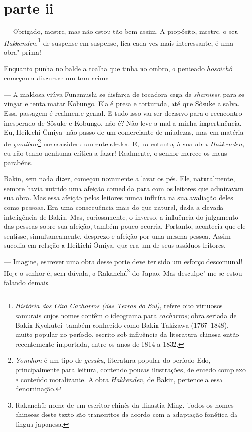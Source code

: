 \section*{parte ii}

--- Obrigado, mestre, mas não estou tão bem assim. A propósito, mestre, o
seu \textit{Hakkenden},\footnote{\textit{História dos Oito Cachorros (das Terras do Sul)}, refere oito
virtuosos samurais cujos nomes contêm o ideograma para \textit{cachorros};
obra seriada de Bakin Kyokutei, também conhecido como Bakin Takizawa 
(1767--1848), muito popular no
período, escrito sob influência da literatura chinesa então
recentemente importada, entre os anos de 1814 a 1832.} de suspense em
suspense, fica cada vez mais interessante, é uma obra"-prima!

Enquanto punha no balde a toalha que tinha no ombro, o penteado
\textit{hosoichô} começou a discursar um tom acima.  

--- A maldosa viúva Funamushi se disfarça de tocadora cega de
\textit{shamisen} para se vingar e tenta matar Kobungo. Ela é presa e
torturada, até que Sôsuke a salva. Essa passagem é realmente genial. E
tudo isso vai ser decisivo para o reencontro inesperado de Sôsuke e
Kobungo, não é? Não leve a mal a minha impertinência. Eu, Heikichi Ômiya, 
não passo de um comerciante de miudezas, mas em matéria de
\textit{yomihon}\footnote{ \textit{Yomihon} é um tipo de \textit{gesaku}, literatura popular do período Edo, principalmente para leitura,
contendo poucas ilustrações, de enredo complexo e conteúdo moralizante.
A obra \textit{Hakkenden}, de Bakin, pertence a essa denominação.} me
considero um entendedor. E, no entanto, à sua obra \textit{Hakkenden},
eu não tenho nenhuma crítica a fazer! Realmente, o senhor merece os
meus parabéns.

Bakin, sem nada dizer, começou novamente a lavar os pés. Ele,
naturalmente, sempre havia nutrido uma afeição comedida para com os
leitores que admiravam sua obra. Mas essa afeição pelos leitores nunca
influíra na sua avaliação deles como pessoas. Era uma consequência mais
do que natural, dada a elevada inteligência de Bakin. Mas,
curiosamente, o inverso, a influência do julgamento das pessoas sobre
sua afeição, também pouco ocorria. Portanto, acontecia que ele
sentisse, simultaneamente, desprezo e afeição por uma mesma pessoa.
Assim sucedia em relação a Heikichi Ômiya, que era um de seus assíduos leitores.

--- Imagine, escrever uma obra desse porte deve ter sido um esforço
descomunal! Hoje o senhor é, sem dúvida, o Rakanchû\footnote{ Rakanchû:
nome de um escritor chinês da dinastia Ming. Todos os nomes chineses
deste texto são transcritos de acordo com a adaptação fonética da
língua japonesa.} do Japão. Mas desculpe"-me se estou falando demais.

